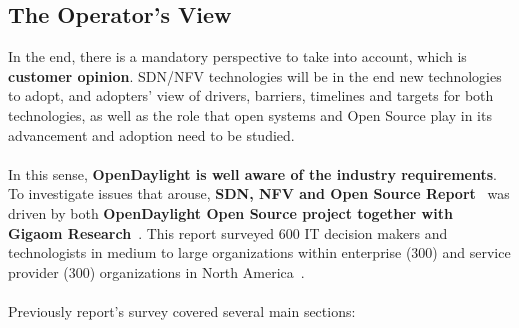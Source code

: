 \documentclass[a4paper, 12pt]{book}
\begin{document}
\subsection{The Operator's View}
In the end, there is a mandatory perspective to take into account, which is \textbf{customer opinion}. SDN/NFV technologies will be in the end new technologies to adopt, and adopters' view of drivers, barriers, timelines and targets for both technologies, as well as the role that open systems and Open Source play in its advancement and adoption need to be studied.\\
\\
In this sense, \textbf{OpenDaylight is well aware of the industry requirements}. To investigate issues that arouse, \textbf{SDN, NFV and Open Source Report}~\cite{SDNandNFVOperatorsView} was driven by both \textbf{OpenDaylight Open Source project together with Gigaom Research}~\cite{GigaomResearch}. This report surveyed 600 IT decision makers and technologists in medium to large organizations within enterprise (300) and service provider (300) organizations in North America~\cite{SDNandNFVOperatorsView}.\\
\\
Previously report's survey covered several main sections:
\end{document}
